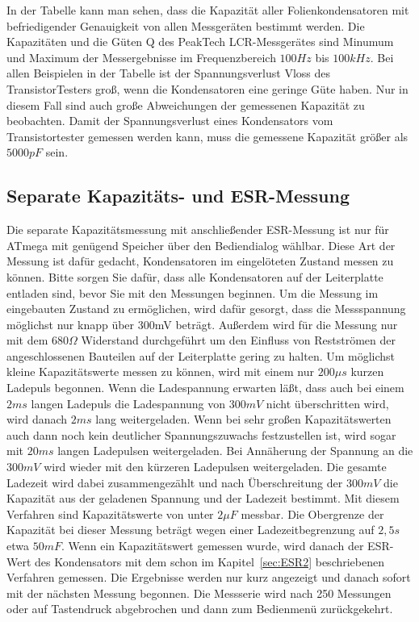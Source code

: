 In der Tabelle kann man sehen, dass die Kapazität aller Folienkondensatoren mit befriedigender Genauigkeit von allen
Messgeräten bestimmt werden. Die Kapazitäten und die Güten Q des PeakTech LCR-Messgerätes sind Minumum
und Maximum der Messergebnisse im Frequenzbereich \(100 Hz\) bis \(100 kHz\).
Bei allen Beispielen in der Tabelle ist der Spannungsverlust Vloss des TransistorTesters groß,
wenn die Kondensatoren eine geringe Güte haben. Nur in diesem Fall sind auch große Abweichungen
der gemessenen Kapazität zu beobachten. Damit der Spannungsverlust eines Kondensators vom
Transistortester gemessen werden kann, muss die gemessene Kapazität größer als \(5000 pF\) sein.

\subsection{Separate Kapazitäts- und ESR-Messung}
Die separate Kapazitätsmessung mit anschließender ESR-Messung ist nur für ATmega mit genügend Speicher
über den Bediendialog wählbar. Diese Art der Messung ist dafür gedacht, Kondensatoren im eingelöteten
Zustand messen zu können. 
Bitte sorgen Sie dafür, dass alle Kondensatoren auf der Leiterplatte entladen sind, bevor Sie mit den
Messungen beginnen.
Um die Messung im eingebauten Zustand zu ermöglichen, wird dafür gesorgt,
dass die Messspannung möglichst nur knapp über 300mV beträgt.
Außerdem wird für die Messung nur mit dem \(680 \Omega\) Widerstand durchgeführt um den Einfluss von
Restströmen der angeschlossenen Bauteilen auf der Leiterplatte gering zu halten.
Um möglichst kleine Kapazitätswerte messen zu können, wird mit einem nur \(200 \mu s\) kurzen Ladepuls
begonnen. Wenn die Ladespannung erwarten läßt, dass auch bei einem \(2 ms\) langen Ladepuls die Ladespannung
von \(300 mV\) nicht überschritten wird, wird danach \(2 ms\) lang weitergeladen. Wenn bei sehr großen
Kapazitätswerten auch dann noch kein deutlicher Spannungszuwachs festzustellen ist, wird sogar mit
\(20 ms\) langen Ladepulsen weitergeladen. Bei Annäherung der Spannung an die \(300 mV\) wird wieder
mit den kürzeren Ladepulsen weitergeladen. Die gesamte Ladezeit wird dabei zusammengezählt und nach
Überschreitung der \(300 mV\) die Kapazität aus der geladenen Spannung und der Ladezeit bestimmt.
Mit diesem Verfahren sind Kapazitätswerte von unter \(2 \mu F\) messbar. Die Obergrenze der Kapazität
bei dieser Messung beträgt wegen einer Ladezeitbegrenzung auf \(2,5 s\) etwa \(50 mF\).
Wenn ein Kapazitätswert gemessen wurde, wird danach der ESR-Wert des Kondensators mit dem schon
im Kapitel~\ref{sec:ESR2} beschriebenen Verfahren gemessen.
Die Ergebnisse werden nur kurz angezeigt und danach sofort mit der nächsten Messung begonnen.
Die Messserie wird nach 250 Messungen oder auf Tastendruck abgebrochen und dann zum Bedienmenü zurückgekehrt.

